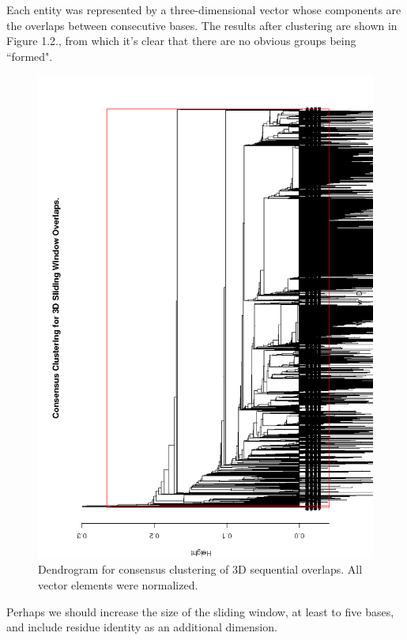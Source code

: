 Each entity was represented by a three-dimensional vector whose components
are the overlaps between consecutive bases.
The results after clustering are shown in Figure 1.2.,  from which it's clear that
there are no obvious groups being ``formed".
\begin{figure}[htbp]
\centering 
\includegraphics[angle=0, scale=0.8]{Chapter1/3Dwindow.png}
\caption{Dendrogram for consensus clustering of 3D sequential
overlaps. All vector elements were normalized.}
\end{figure}
Perhaps we should increase the size of
the sliding window, at least to five bases, and include residue identity as
an additional dimension.

